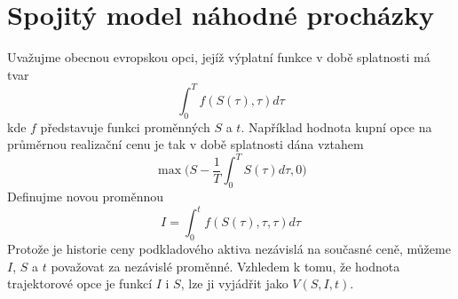 \documentclass[a4paper]{book}
\begin{document}
\section{Spojitý model náhodné procházky}

Uvažujme obecnou evropskou opci, jejíž výplatní funkce v době splatnosti má tvar
\begin{equation*}
\int_0^T f(S(\tau), \tau) d \tau
\end{equation*}
kde $f$ představuje funkci proměnných $S$ a $t$. Například hodnota kupní opce na průměrnou realizační cenu je tak v době splatnosti dána vztahem
\begin{equation*}
\max \Big( S - \frac{1}{T} \int_0^T S(\tau) d \tau, 0 \Big)
\end{equation*}
Definujme novou proměnnou
\begin{equation*}
I = \int_0^t f(S(\tau), \tau, \tau) d \tau
\end{equation*}
Protože je historie ceny podkladového aktiva nezávislá na současné ceně, můžeme $I$, $S$ a $t$ považovat za nezávislé proměnné. Vzhledem k tomu, že hodnota trajektorové opce je funkcí $I$ i $S$, lze ji vyjádřit jako $V(S,I,t)$.
\end{document}
